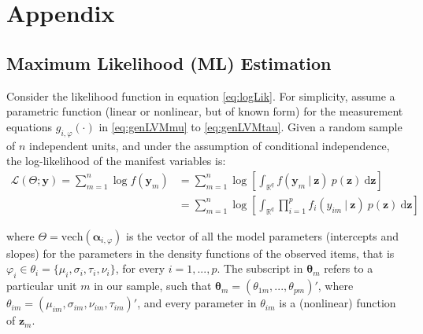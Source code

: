 \documentclass[11pt, a4paper]{article}
\newcommand{\R}{{\ensuremath{\mathbb{R}}}}
\newcommand{\cond}{\!~|~\!}
\begin{document}
\setcounter{table}{0}
\setcounter{algorithm}{0}
\setcounter{figure}{0}
\renewcommand{\thetable}{A\arabic{table}}
\renewcommand{\thealgorithm}{A\arabic{algorithm}}
\renewcommand{\thefigure}{A\arabic{figure}}

\section{Appendix}

\subsection{Maximum Likelihood (ML) Estimation}

Consider the likelihood function in equation \eqref{eq:logLik}. For simplicity, assume a parametric function (linear or nonlinear, but of known form) for the measurement equations $g_{i,\varphi}(\cdot)$ in \eqref{eq:genLVMmu} to \eqref{eq:genLVMtau}. Given a random sample of $n$ independent units, and under the assumption of conditional independence, the log-likelihood of the manifest variables is:
\begin{align*}
\mathcal{L}(\Theta; \mathbf{y}) = \sum_{m=1}^{n} \log f(\mathbf{y}_m) & = \sum_{m=1}^{n} \log \left[\int_{\R^q} f(\mathbf{y}_m \cond \mathbf{z})~ p(\mathbf{z}) ~ \text{d}\mathbf{z}\right] \nonumber \\ & = \sum_{m=1}^{n} \log \left[\int_{\R^q} \prod_{i=1}^p f_i(y_{im} \cond \mathbf{z}) ~ p(\mathbf{z}) ~ \text{d}\mathbf{z}\right]
\end{align*}

where $\Theta = \mathrm{vech}(\bm{\alpha}_{i,\varphi})$ is the vector of all the model parameters (intercepts and slopes) for the parameters in the density functions of the observed items, that is $\varphi_i \in \theta_i = \{\mu_i, \sigma_i, \tau_i, \nu_i\}$, for every $i = 1,...,p$. The subscript in $\bm{\theta}_m$ refers to a particular unit $m$ in our sample, such that $\bm{\theta}_m = (\theta_{1m},...,\theta_{pm})'$, where $\theta_{im} = (\mu_{im}, \sigma_{im}, \nu_{im}, \tau_{im})'$, and every parameter in $\theta_{im}$ is a (nonlinear) function of $\mathbf{z}_{m}$.
\end{document}
